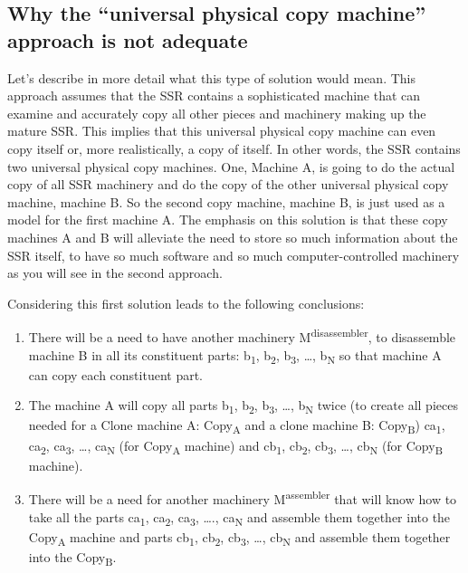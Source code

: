 \subsection[Why the “universal physical copy machine” approach is not adequate]{Why
the “universal physical copy machine” approach is not adequate}

Let’s describe in more detail
what this type of solution would mean. This approach assumes that the
SSR contains a sophisticated machine that can examine and accurately
copy all other pieces and machinery making up the mature SSR. This
implies that this universal physical copy machine can even copy itself or, more
realistically, a copy of itself. In other words, the SSR contains two
universal physical copy machines.  One, Machine A, is going to do the actual copy of
all SSR machinery and do the copy of the other universal physical copy machine,
machine B. So the second copy machine, machine B, is just used as a
model for the first machine A. The emphasis on this solution is
that these copy machines A and B will alleviate the need to store
so much information about the SSR itself, to have so much software and so much
computer-controlled machinery as you will see in the second approach.

Considering this first solution leads to the following conclusions:

\begin{enumerate}
\item There will be a need to have another machinery
M\textsuperscript{disassembler}, to disassemble machine B in all its
constituent parts: b\textsubscript{1}, b\textsubscript{2},
b\textsubscript{3}, …, b\textsubscript{N }so that machine A can copy
each constituent part.
\item The machine A will copy all parts b\textsubscript{1},
b\textsubscript{2}, b\textsubscript{3}, …, b\textsubscript{N} twice (to
create all pieces needed for a Clone machine A: Copy\textsubscript{A}
and a clone machine B: Copy\textsubscript{B}) ca\textsubscript{1},
ca\textsubscript{2}, ca\textsubscript{3}, …, ca\textsubscript{N }(for
Copy\textsubscript{A }machine) and cb\textsubscript{1},
cb\textsubscript{2}, cb\textsubscript{3}, …, cb\textsubscript{N} (for
Copy\textsubscript{B} machine).
\item There will be a need for another machinery
M\textsuperscript{assembler} that will know how to take all the parts
ca\textsubscript{1}, ca\textsubscript{2}, ca\textsubscript{3}, ….,
ca\textsubscript{N} and assemble them together into the
Copy\textsubscript{A} machine and parts cb\textsubscript{1},
cb\textsubscript{2}, cb\textsubscript{3}, …, cb\textsubscript{N} and
assemble them together into the Copy\textsubscript{B}. 
\end{enumerate}

